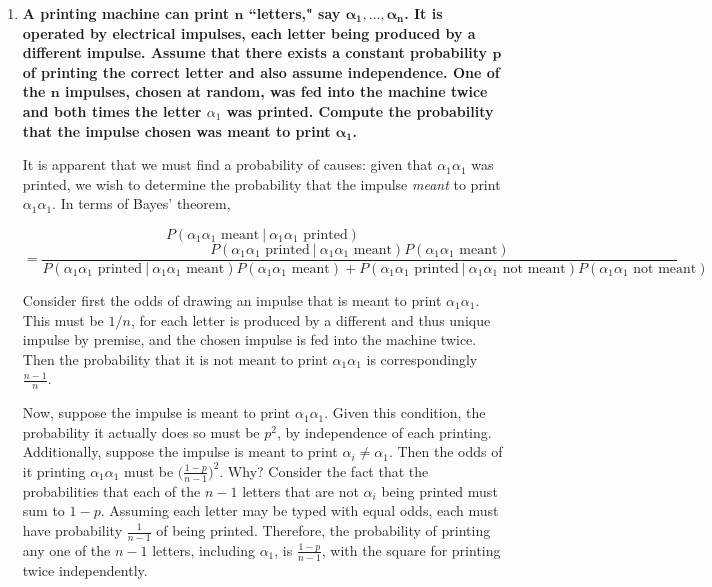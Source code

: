\documentclass[10pt, oneside]{article}
\begin{document}
\begin{enumerate}[label=3.\arabic*]
\begin{proof}
\end{proof}

\item  \begin{tcolorbox}[
  colback=Cerulean!5!white,
  colframe=Cerulean!75!black]
\textbf{A printing machine can print $\bm{n}$ ``letters," say $\bm{\alpha_1, ..., \alpha_n}$. It is operated by electrical impulses, each letter being produced by a different impulse. Assume that there exists a constant probability $\bm{p}$ of printing the correct letter and also assume independence. One of the $\bm{n}$ impulses, chosen at random, was fed into the machine twice and both times the letter $\alpha_1$ was printed. Compute the probability that the impulse chosen was meant to print $\bm{\alpha_1}$.}
\end{tcolorbox}

It is apparent that we must find a probability of causes: given that $\alpha_1 \alpha_1$ was printed, we wish to determine the probability that the impulse \textit{meant} to print $\alpha_1 \alpha_1$. In terms of Bayes' theorem,

\[ P(\alpha_1 \alpha_1 \text{ meant} \ | \ \alpha_1 \alpha_1 \text{ printed}) \] 
\[ = \frac{P(\alpha_1 \alpha_1 \text{ printed} \ | \ \alpha_1 \alpha_1 \text{ meant}) P(\alpha_1 \alpha_1 \text{ meant})}{P(\alpha_1 \alpha_1 \text{ printed} \ | \ \alpha_1 \alpha_1 \text{ meant}) P(\alpha_1 \alpha_1 \text{ meant}) + P(\alpha_1 \alpha_1 \text{ printed} \ | \ \alpha_1 \alpha_1 \text{ not meant}) P(\alpha_1 \alpha_1 \text{ not meant})} \]

Consider first the odds of drawing an impulse that is meant to print $\alpha_1 \alpha_1$. This must be $1/n$, for each letter is produced by a different and thus unique impulse by premise, and the chosen impulse is fed into the machine twice. Then the probability that it is not meant to print $\alpha_1 \alpha_1$ is correspondingly $\frac{n-1}{n}$.

Now, suppose the impulse is meant to print $\alpha_1 \alpha_1$. Given this condition, the probability it actually does so must be $p^2$, by independence of each printing. Additionally, suppose the impulse is meant to print $\alpha_i \neq \alpha_1$. Then the odds of it printing $\alpha_1 \alpha_1$ must be $\big( \frac{1-p}{n-1} \big)^2$. Why? Consider the fact that the probabilities that each of the $n-1$ letters that are not $\alpha_i$ being printed must sum to $1-p$. Assuming each letter may be typed with equal odds, each must have probability $\frac{1}{n-1}$ of being printed. Therefore, the probability of printing any one of the $n-1$ letters, including $\alpha_1$, is $\frac{1-p}{n-1}$, with the square for printing twice independently.


\end{enumerate}
\end{document}
